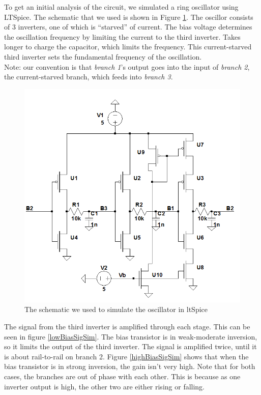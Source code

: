 \documentclass{article}
\begin{document}
To get an initial analysis of the circuit, we simulated a ring oscillator using LTSpice. The schematic that we used is shown in Figure \ref{schem}. The oscillor consists of 3 inverters, one of which is ``starved'' of current. The bias voltage determines the oscillation frequency by limiting the current to the third inverter. Takes longer to charge the capacitor, which limits the frequency. This current-starved third inverter sets the fundamental frequency of the oscillation. \\

Note: our convention is that \emph{branch 1}'s output goes into the input of \emph{branch 2}, the current-starved branch, which feeds into \emph{branch 3}.

\begin{figure}[H]
\centering
\includegraphics[scale=.5]{finalSchem2.png}
\caption{The schematic we used to simulate the oscillator in ltSpice}
\label{schem}
\end{figure}

The signal from the third inverter is amplified through each stage. This can be seen in figure \ref{lowBiasSigSim}. The bias transistor is in weak-moderate inversion, so it limits the output of the third inverter. The signal is amplified twice, until it is about rail-to-rail on branch 2. Figure \ref{highBiasSigSim} shows that when the bias transistor is in strong inversion, the gain isn't very high. Note that for both cases, the branches are out of phase with each other. This is because as one inverter output is high, the other two are either rising or falling. \\
\end{document}
